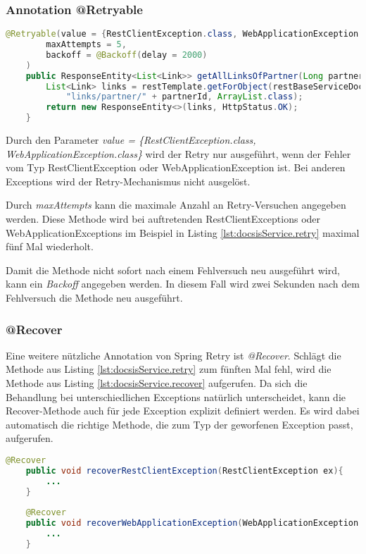 \subsubsection{Annotation @Retryable}
\label{ann:retryable}
\begin{lstlisting}[language=java, caption=DocsisService.java, label={lst:docsisService.retry}]
	@Retryable(value = {RestClientException.class, WebApplicationException.class},
		maxAttempts = 5,
		backoff = @Backoff(delay = 2000)
	)
	public ResponseEntity<List<Link>> getAllLinksOfPartner(Long partnerId) {
		List<Link> links = restTemplate.getForObject(restBaseServiceDocsis + 
			"links/partner/" + partnerId, ArrayList.class);
		return new ResponseEntity<>(links, HttpStatus.OK);
	}	
\end{lstlisting}

Durch den Parameter \textit{value = \{RestClientException.class, WebApplicationException.class\}} wird der Retry nur ausgeführt, wenn der Fehler vom Typ RestClientException oder WebApplicationException ist. Bei anderen Exceptions wird der Retry-Mechanismus nicht ausgelöst. 

Durch \textit{maxAttempts} kann die maximale Anzahl an Retry-Versuchen angegeben werden. Diese Methode wird bei auftretenden RestClientExceptions oder WebApplicationExceptions im Beispiel in Listing \ref{lst:docsisService.retry} maximal fünf Mal wiederholt.

Damit die Methode nicht sofort nach einem Fehlversuch neu ausgeführt wird, kann ein \textit{Backoff} angegeben werden. In diesem Fall wird zwei Sekunden nach dem Fehlversuch die Methode neu ausgeführt. \newline


\subsubsection{@Recover}
\label{ann:recover}
Eine weitere nützliche Annotation von Spring Retry ist \textit{@Recover}. Schlägt die Methode aus Listing \ref{lst:docsisService.retry} zum fünften Mal fehl, wird die Methode aus Listing \ref{lst:docsisService.recover} aufgerufen. Da sich die Behandlung bei unterschiedlichen Exceptions natürlich unterscheidet, kann die Recover-Methode auch für jede Exception explizit definiert werden. Es wird dabei automatisch die richtige Methode, die zum Typ der geworfenen Exception passt, aufgerufen.

\begin{lstlisting}[language=java, caption=DocsisService.java, label={lst:docsisService.recover}]
	@Recover
	public void recoverRestClientException(RestClientException ex){
		...
	}
	
	@Recover
	public void recoverWebApplicationException(WebApplicationException ex){
		...
	}
\end{lstlisting}

